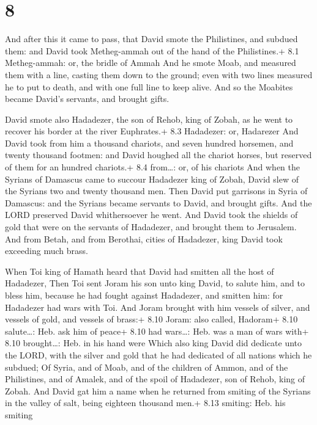 \hypertarget{section-7}{%
\section{8}\label{section-7}}

 And after this it came to pass, that David smote the
Philistines, and subdued them: and David took Metheg-ammah out of the
hand of the Philistines.+ 8.1 Metheg-ammah: or, the bridle of Ammah
 And he smote Moab, and measured them with a line, casting
them down to the ground; even with two lines measured he to put to
death, and with one full line to keep alive. And so the Moabites became
David's servants, and brought gifts.

 David smote also Hadadezer, the son of Rehob, king of
Zobah, as he went to recover his border at the river Euphrates.+ 8.3
Hadadezer: or, Hadarezer  And David took from him a thousand
chariots, and seven hundred horsemen, and twenty thousand footmen: and
David houghed all the chariot horses, but reserved of them for an
hundred chariots.+ 8.4 from\ldots: or, of his chariots  And
when the Syrians of Damascus came to succour Hadadezer king of Zobah,
David slew of the Syrians two and twenty thousand men.  Then
David put garrisons in Syria of Damascus: and the Syrians became
servants to David, and brought gifts. And the LORD preserved David
whithersoever he went.  And David took the shields of gold
that were on the servants of Hadadezer, and brought them to Jerusalem.
 And from Betah, and from Berothai, cities of Hadadezer,
king David took exceeding much brass.

 When Toi king of Hamath heard that David had smitten all
the host of Hadadezer,  Then Toi sent Joram his son unto
king David, to salute him, and to bless him, because he had fought
against Hadadezer, and smitten him: for Hadadezer had wars with Toi. And
Joram brought with him vessels of silver, and vessels of gold, and
vessels of brass:+ 8.10 Joram: also called, Hadoram+ 8.10 salute\ldots:
Heb. ask him of peace+ 8.10 had wars\ldots: Heb. was a man of wars with+
8.10 brought\ldots: Heb. in his hand were  Which also king
David did dedicate unto the LORD, with the silver and gold that he had
dedicated of all nations which he subdued;  Of Syria, and
of Moab, and of the children of Ammon, and of the Philistines, and of
Amalek, and of the spoil of Hadadezer, son of Rehob, king of Zobah.
 And David gat him a name when he returned from smiting of
the Syrians in the valley of salt, being eighteen thousand men.+ 8.13
smiting: Heb. his smiting

